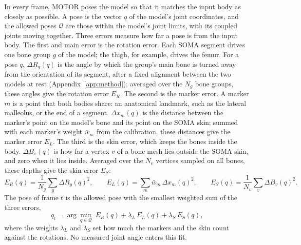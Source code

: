 \documentclass[11pt]{article}
\makeatletter
\renewcommand\paragraph{\@startsection{paragraph}{4}{\z@}{1.6ex \@plus .5ex \@minus .2ex}{-1em}{\normalfont\normalsize\bfseries}}
\makeatother
\begin{document}
\paragraph{Kinematic fit.} In every frame, MOTOR poses the model so that it matches the input body as closely as
possible. A pose is the vector $q$ of the model's joint coordinates, and the allowed poses $\mathcal{Q}$ are those
within the model's joint limits, with its coupled joints moving together. Three errors measure how far a pose is from
the input body. The first and main error is the rotation error. Each SOMA segment drives one bone group $g$ of the model; the thigh,
for example, drives the femur. For a pose $q$, $\Delta R_g(q)$ is the angle by which the group's main bone is turned
away from the orientation of its segment, after a fixed alignment between the two models at rest
(Appendix~\ref{app:method}); averaged over the $N_g$ bone groups, these angles give the rotation error $E_R$.
The second is the marker error. A marker $m$ is a point that both bodies share: an anatomical landmark, such as the
lateral malleolus, or the end of a segment. $\Delta x_m(q)$ is the distance between the marker's point on the model's
bone and its point on the SOMA skin; summed with each marker's weight $\bar w_m$ from the calibration, these
distances give the marker error $E_L$. The third is the skin error, which keeps the bones inside the body. $\Delta B_v(q)$ is how far a vertex $v$ of a bone
mesh lies outside the SOMA skin, and zero when it lies inside. Averaged over the $N_v$ vertices sampled on all bones,
these depths give the skin error $E_S$:
\begin{equation*}
E_R(q)=\frac{1}{N_g}\sum_{g}\Delta R_g(q)^2,\qquad
E_L(q)=\sum_{m}\bar w_m\,\Delta x_m(q)^2,\qquad
E_S(q)=\frac{1}{N_v}\sum_{v}\Delta B_v(q)^2.
\end{equation*}
The pose of frame $t$ is the allowed pose with the smallest weighted sum of the three errors,
\begin{equation}
q_t=\arg\min_{q\in\mathcal{Q}}\;E_R(q)+\lambda_L\,E_L(q)+\lambda_S\,E_S(q),
\label{eq:fit}
\end{equation}
where the weights $\lambda_L$ and $\lambda_S$ set how much the markers and the skin count against the rotations. No
measured joint angle enters this fit.
\end{document}
